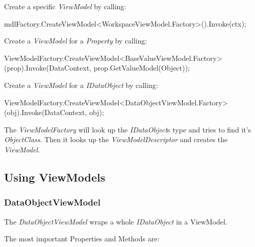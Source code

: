 Create a specific \emph{ViewModel} by calling:

\begin{CS}
	mdlFactory.CreateViewModel<WorkspaceViewModel.Factory>().Invoke(ctx);
\end{CS}

Create a \emph{ViewModel} for a \emph{Property} by calling:

\begin{CS}
	ViewModelFactory.CreateViewModel<BaseValueViewModel.Factory>(prop).Invoke(DataContext,
prop.GetValueModel(Object));
\end{CS}

Create a \emph{ViewModel} for a \emph{IDataObject} by calling:

\begin{CS}
	ViewModelFactory.CreateViewModel<DataObjectViewModel.Factory>(obj).Invoke(DataContext, obj);
\end{CS}

The \emph{ViewModelFactory} will look up the \emph{IDataObject}s type and tries
to find it's \emph{ObjectClass}. Then it looks up the \emph{ViewModelDescriptor}
and creates the \emph{ViewModel}.

\subsection{Using ViewModels}

\subsubsection{DataObjectViewModel}
The \emph{DataObjectViewModel} wraps a whole \emph{IDataObject} in a ViewModel.

The most important Properties and Methods are:

